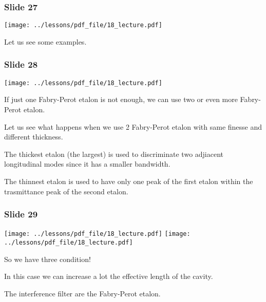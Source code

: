 \documentclass[../main/main.tex]{subfiles}
\begin{document}
\subsubsection*{Slide 27}

\begin{minipage}[]{0.5\linewidth}
\centering
\texttt{[image: ../lessons/pdf\_file/18\_lecture.pdf]}
\end{minipage}
\hspace{0.3cm}\vspace{0.3cm}
\begin{minipage}[c]{0.47\linewidth}

Let us see some examples.

\end{minipage}

\subsubsection*{Slide 28}

\begin{minipage}[]{0.5\linewidth}
\centering
\texttt{[image: ../lessons/pdf\_file/18\_lecture.pdf]}
\end{minipage}
\hspace{0.3cm}\vspace{0.3cm}
\begin{minipage}[c]{0.47\linewidth}

If just one Fabry-Perot etalon is not enough, we can use two or even more Fabry-Perot etalon.

Let us see what happens when we use 2 Fabry-Perot etalon with same finesse and different thickness.

The thickest etalon (the largest) is used to discriminate two adjiacent longitudinal modes since it has a smaller bandwidth.

The thinnest etalon is used to have only one peak of the first etalon within the trasmittance peak of the second etalon.


\end{minipage}

\subsubsection*{Slide 29}

\begin{minipage}[]{0.5\linewidth}
\centering
\texttt{[image: ../lessons/pdf\_file/18\_lecture.pdf]}
\texttt{[image: ../lessons/pdf\_file/18\_lecture.pdf]}
\end{minipage}
\hspace{0.3cm}\vspace{0.3cm}
\begin{minipage}[c]{0.47\linewidth}

So we have three condition!

In this case we can increase a lot the effective length of the cavity.

The interference filter are the Fabry-Perot etalon.

\end{minipage}
\end{document}
